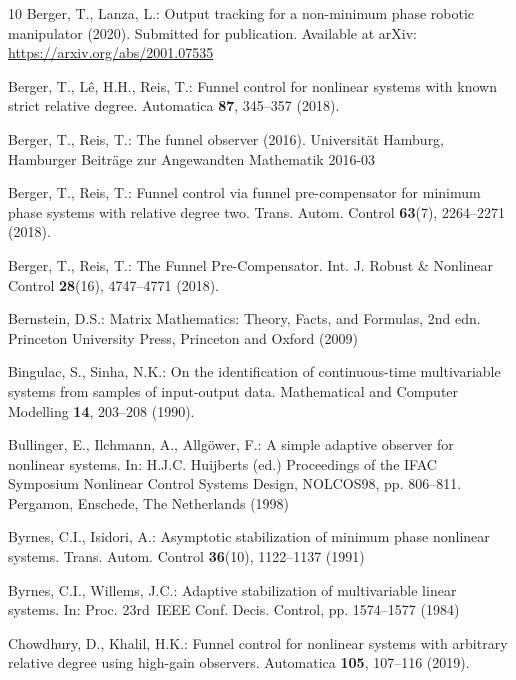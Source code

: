 \documentclass[ envcountsect, envcountsame]{svjour3}
\begin{document}
\begin{thebibliography}{10}
Berger, T., Lanza, L.: Output tracking for a non-minimum phase robotic
  manipulator (2020).
\newblock Submitted for publication. Available at arXiv:
  \url{https://arxiv.org/abs/2001.07535}

Berger, T., L{\^e}, H.H., Reis, T.: Funnel control for nonlinear systems with
  known strict relative degree.
\newblock Automatica \textbf{87}, 345--357 (2018).
\newblock {}

Berger, T., Reis, T.: The funnel observer (2016).
\newblock Universit\"at Hamburg, Hamburger Beitr\"age zur Angewandten
  Mathematik 2016-03

Berger, T., Reis, T.: Funnel control via funnel pre-compensator for minimum
  phase systems with relative degree two.
 Trans. Autom. Control \textbf{63}(7), 2264--2271 (2018).
\newblock {}

Berger, T., Reis, T.: The {F}unnel {P}re-{C}ompensator.
\newblock Int. J. Robust \& Nonlinear Control \textbf{28}(16), 4747--4771
  (2018).
\newblock {}

Bernstein, D.S.: Matrix Mathematics: Theory, Facts, and Formulas, 2nd edn.
\newblock Princeton University Press, Princeton and Oxford (2009)

Bingulac, S., Sinha, N.K.: On the identification of continuous-time
  multivariable systems from samples of input-output data.
\newblock Mathematical and Computer Modelling \textbf{14}, 203--208 (1990).
\newblock {}

Bullinger, E., Ilchmann, A., Allg{\"o}wer, F.: A simple adaptive observer for
  nonlinear systems.
\newblock In: H.J.C. Huijberts (ed.) Proceedings of the {IFAC} Symposium
  Nonlinear Control Systems Design, NOLCOS98, pp. 806--811. Pergamon, Enschede,
  {The Netherlands} (1998)
  
Byrnes, C.I., Isidori, A.: Asymptotic stabilization of minimum phase nonlinear
  systems.
 Trans. Autom. Control \textbf{36}(10), 1122--1137 (1991)

Byrnes, C.I., Willems, J.C.: Adaptive stabilization of multivariable linear
  systems.
\newblock In: Proc. 23rd~{IEEE} Conf. Decis. Control, pp. 1574--1577 (1984)

Chowdhury, D., Khalil, H.K.: Funnel control for nonlinear systems with
  arbitrary relative degree using high-gain observers.
\newblock Automatica \textbf{105}, 107--116 (2019).
\newblock {}


\end{thebibliography}
\end{document}
